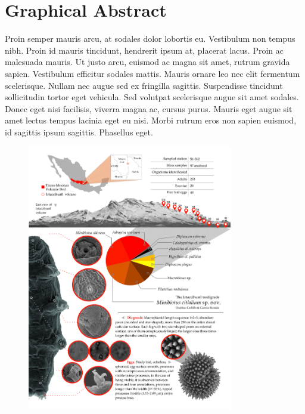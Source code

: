
\chapter*{Graphical Abstract}

Proin semper mauris arcu, at sodales dolor lobortis eu. Vestibulum non tempus nibh. Proin id mauris tincidunt, hendrerit ipsum at, placerat lacus. Proin ac malesuada mauris. Ut justo arcu, euismod ac magna sit amet, rutrum gravida sapien. Vestibulum efficitur sodales mattis. Mauris ornare leo nec elit fermentum scelerisque. Nullam nec augue sed ex fringilla sagittis. Suspendisse tincidunt sollicitudin tortor eget vehicula. Sed volutpat scelerisque augue sit amet sodales. Donec eget nisi facilisis, viverra magna ac, cursus purus. Mauris eget augue sit amet lectus tempus lacinia eget eu nisi. Morbi rutrum eros non sapien euismod, id sagittis ipsum sagittis. Phasellus eget.


\begin{figure}[h]
\centering
\includegraphics[width=0.8\textwidth]{fig/Graphical-Abstract-example.png}
\end{figure}

